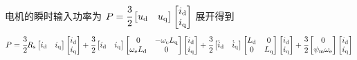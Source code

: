 电机的瞬时输入功率为
\(P=\cfrac 32\begin{bmatrix}u_{\mathrm{d}}&u_{\mathrm{q}}\end{bmatrix}
\begin{bmatrix}i_{\mathrm{d}}\\i_{\mathrm{q}}\end{bmatrix}\)
展开得到
\begin{equation*}
    P=\cfrac 32R_{\mathrm{s}}\begin{bmatrix}i_{\mathrm{d}}&i_{\mathrm{q}}\end{bmatrix}
    \begin{bmatrix}i_{\mathrm{d}}\\i_{\mathrm{q}}\end{bmatrix}+
    \cfrac 32\begin{bmatrix}i_{\mathrm{d}}&i_{\mathrm{q}}\end{bmatrix}
    \begin{bmatrix}0&-\omega_{\mathrm{e}}L_{\mathrm{q}}\\\omega_{\mathrm{e}}L_{\mathrm{d}}&0\end{bmatrix}
    \begin{bmatrix}i_{\mathrm{d}}\\i_{\mathrm{q}}\end{bmatrix}
    +\cfrac 32\begin{bmatrix}\dot{i}_{\mathrm{d}}&\dot{i}_{\mathrm{q}}
    \end{bmatrix}\begin{bmatrix}L_{\mathrm{d}}&0\\0&L_{\mathrm{q}}\end{bmatrix}
    \begin{bmatrix}i_{\mathrm{d}}\\i_{\mathrm{q}}\end{bmatrix}+\cfrac 32
    \begin{bmatrix}0\\\psi_{\mathrm{m}}\omega_{\mathrm{e}}\end{bmatrix}
    \begin{bmatrix}i_{\mathrm{d}}\\i_{\mathrm{q}}\end{bmatrix}
\end{equation*}


